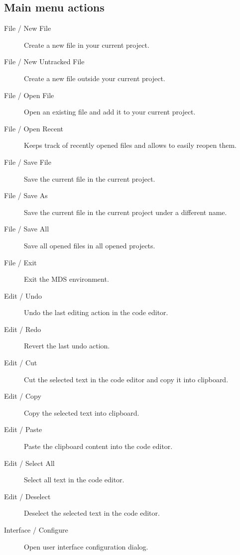     \subsection{Main menu actions}
        \begin{description}
            \item[File / New File] Create a new file in your current project.
            \item[File / New Untracked File] Create a new file outside your current project.
            \item[File / Open File] Open an existing file and add it to your current project.
            \item[File / Open Recent] Keeps track of recently opened files and allows to easily reopen them.
            \item[File / Save File] Save the current file in the current project.
            \item[File / Save As] Save the current file in the current project under a different name.
            \item[File / Save All] Save all opened files in all opened projects.
            \item[File / Exit] Exit the MDS environment.

            \item[Edit / Undo] Undo the last editing action in the code editor.
            \item[Edit / Redo] Revert the last undo action.
            \item[Edit / Cut] Cut the selected text in the code editor and copy it into clipboard.
            \item[Edit / Copy] Copy the selected text into clipboard.
            \item[Edit / Paste] Paste the clipboard content into the code editor.
            \item[Edit / Select All] Select all text in the code editor.
            \item[Edit / Deselect] Deselect the selected text in the code editor.

            \item[Interface / Configure] Open user interface configuration dialog.


\end{description}
